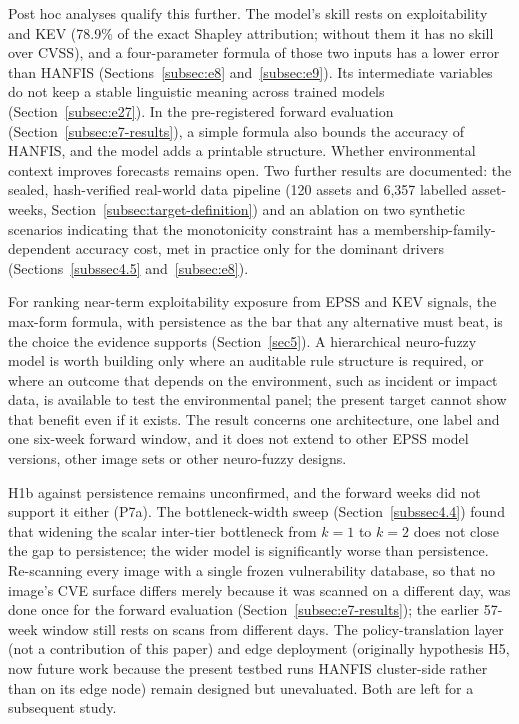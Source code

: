 \documentclass[referee,lineno,pdflatex,sn-basic]{sn-jnl}%
\theoremstyle{thmstyleone}%
\theoremstyle{thmstyletwo}%
\theoremstyle{thmstylethree}%
\begin{document}
Post hoc analyses qualify this further. The model's skill rests on exploitability and KEV (78.9\% of the exact Shapley attribution; without them it has no skill over CVSS), and a four-parameter formula of those two inputs has a lower error than HANFIS (Sections~\ref{subsec:e8} and~\ref{subsec:e9}). Its intermediate variables do not keep a stable linguistic meaning across trained models (Section~\ref{subsec:e27}). In the pre-registered forward evaluation (Section~\ref{subsec:e7-results}), a simple formula also bounds the accuracy of HANFIS, and the model adds a printable structure. Whether environmental context improves forecasts remains open. Two further results are documented: the sealed, hash-verified real-world data pipeline (120 assets and 6{,}357 labelled asset-weeks, Section~\ref{subsec:target-definition}) and an ablation on two synthetic scenarios indicating that the monotonicity constraint has a membership-family-dependent accuracy cost, met in practice only for the dominant drivers (Sections~\ref{subssec4.5} and~\ref{subsec:e8}).

For ranking near-term exploitability exposure from EPSS and KEV signals, the max-form formula, with persistence as the bar that any alternative must beat, is the choice the evidence supports (Section~\ref{sec5}). A hierarchical neuro-fuzzy model is worth building only where an auditable rule structure is required, or where an outcome that depends on the environment, such as incident or impact data, is available to test the environmental panel; the present target cannot show that benefit even if it exists. The result concerns one architecture, one label and one six-week forward window, and it does not extend to other EPSS model versions, other image sets or other neuro-fuzzy designs.

H1b against persistence remains unconfirmed, and the forward weeks did not support it either (P7a). The bottleneck-width sweep (Section~\ref{subssec4.4}) found that widening the scalar inter-tier bottleneck from $k{=}1$ to $k{=}2$ does not close the gap to persistence; the wider model is significantly worse than persistence. Re-scanning every image with a single frozen vulnerability database, so that no image's CVE surface differs merely because it was scanned on a different day, was done once for the forward evaluation (Section~\ref{subsec:e7-results}); the earlier 57-week window still rests on scans from different days. The policy-translation layer (not a contribution of this paper) and edge deployment (originally hypothesis H5, now future work because the present testbed runs HANFIS cluster-side rather than on its edge node) remain designed but unevaluated. Both are left for a subsequent study.
\end{document}
